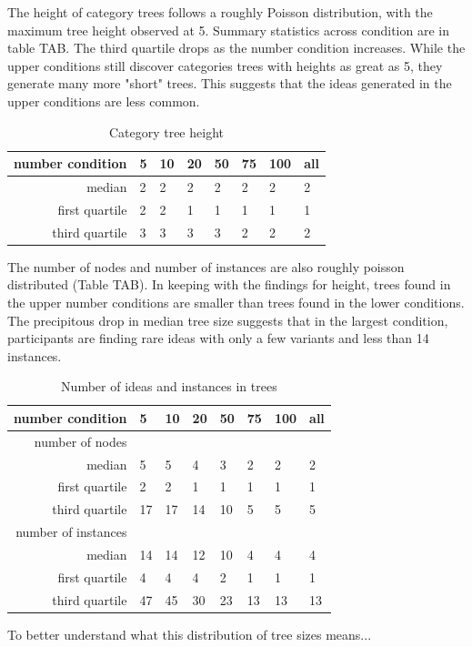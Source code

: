 The height of category trees follows a roughly Poisson distribution, with the maximum tree height observed at 5. Summary statistics across condition are in table TAB. The third quartile drops as the number condition increases. While the upper conditions still discover categories trees with heights as great as 5, they generate many more "short" trees. This suggests that the ideas generated in the upper conditions are less common.

\begin{table}
	\begin{tabular}[h!]{r | l l l l l l l}
	\textbf{number condition} & 5 & 10 & 20 & 50 & 75 & 100 & all \\ \hline \hline
	median & 2 & 2 & 2 & 2 & 2 & 2 & 2\\
	first quartile & 2 & 2  & 1 & 1 & 1 & 1 & 1\\
	third quartile & 3 & 3 &3 &3 &2 &2 & 2\\
	\end{tabular}
	\caption{Category tree height}
\end{table}

The number of nodes and number of instances are also roughly poisson distributed (Table TAB). In keeping with the findings for height, trees found in the upper number conditions are smaller than trees found in the lower conditions. The precipitous drop in median tree size suggests that in the largest condition, participants are finding rare ideas with only a few variants and less than 14 instances.

\begin{table}
\begin{tabular}[h!]{r | l l l l l l l}
	\textbf{number condition} & 5 & 10 & 20 & 50 & 75 & 100 & all \\ \hline \hline
	number of nodes& \\ \hline
    median &5&5&4&3&2&2&2 \\
	first quartile &2&2&1&1&1&1&1 \\
	third quartile &17&17&14&10&5&5&5 \\
	number of instances& \\ \hline
	median &14&14&12&10&4&4&4 \\
    first quartile &4&4&4&2&1&1&1 \\
	third quartile &47&45&30&23&13&13&13 \\
	\end{tabular}
	\caption{Number of ideas and instances in trees}
\end{table}

To better understand what this distribution of tree sizes means...
